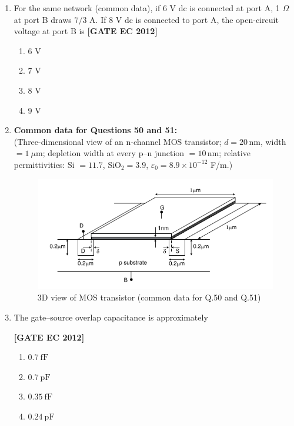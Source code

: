 \documentclass[12pt]{article}
\begin{document}
\begin{enumerate}[leftmargin=1.0em, label=\textbf{Q.\arabic*.}, itemsep=2em]
\begin{enumerate}[leftmargin=2.5em, label=\textbf{Q.\arabic*.}, itemsep=2em, start=46]
\item For the same network (common data), if 6 V dc is connected at port A, 1 $\Omega$ at port B draws $7/3$ A. If 8 V dc is connected to port A, the open-circuit voltage at port B is
\noindent \textbf{[GATE EC 2012]}
\begin{multicols}{2}
    \begin{enumerate}[label=\alph*.]
        \item 6 V
        \item 7 V
        \item 8 V
        \item 9 V
    \end{enumerate}
\end{multicols}

\item[] \textbf{Common data for Questions 50 and 51:}\\

(Three-dimensional view of an n-channel MOS transistor; $d=20\,$nm, width $=1\ \mu$m; depletion width at every p–n junction $=10\,$nm; relative permittivities: Si $=11.7$, SiO$_2=3.9$, $\varepsilon_0 = 8.9\times10^{-12}$ F/m.)

\begin{figure}[H]\centering
\includegraphics[width=0.5\columnwidth]{figs/q50.png}
\caption{3D view of MOS transistor (common data for Q.50 and Q.51)}
\label{fig:q50}
\end{figure}

\item The gate–source overlap capacitance is approximately

\noindent \textbf{[GATE EC 2012]}
\begin{multicols}{2}
    \begin{enumerate}[label=\alph*.]
        \item $0.7\ \text{fF}$
        \item $0.7\ \text{pF}$
        \item $0.35\ \text{fF}$
        \item $0.24\ \text{pF}$
    \end{enumerate}
\end{multicols}


\end{enumerate}
\end{enumerate}
\end{document}
